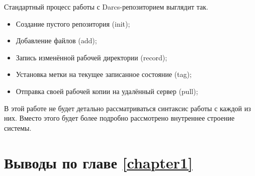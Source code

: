 Стандартный процесс работы с Darcs-репозиторием выглядит так. 

\begin{itemize}
\item Создание пустого репозитория (init);
\item Добавление файлов (add);
\item Запись изменённой рабочей директории (record);
\item Установка метки на текущее записанное состояние (tag);
\item Отправка своей рабочей копии на удалённый сервер (pull);
\end{itemize}

В этой работе не будет детально рассматриваться синтаксис работы с
каждой из них. Вместо этого будет более подробно рассмотрено
внутреннее строение системы.


\section{Выводы по главе \ref{chapter1}}
